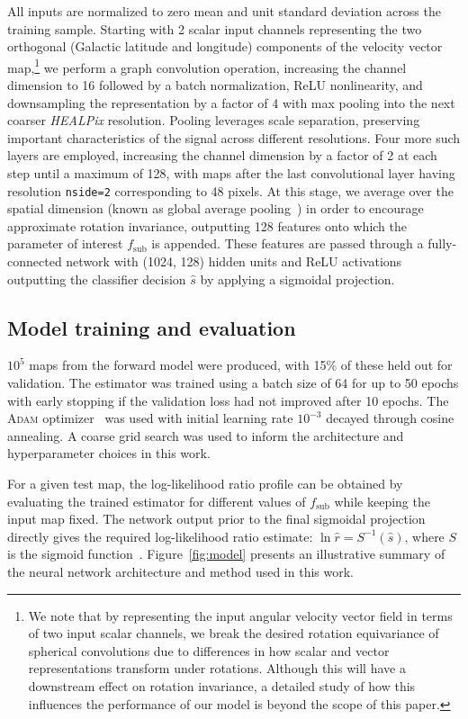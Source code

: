 \documentclass[twocolumn,linenumbers]{aastex631}
\newcommand{\package}[1]{\textsl{#1}\xspace}
\newcommand{\healpix}{\package{HEALPix}}
\begin{document}
All inputs are normalized to zero mean and unit standard deviation across the training sample. Starting with 2 scalar input channels representing the two orthogonal (Galactic latitude and longitude) components of the velocity vector map,\footnote{We note that by representing the input angular velocity vector field in terms of two input scalar channels, we break the desired rotation equivariance of spherical convolutions due to differences in how scalar and vector representations transform under rotations. Although this will have a downstream effect on rotation invariance, a detailed study of how this influences the performance of our model is beyond the scope of this paper.} we perform a graph convolution operation, increasing the channel dimension to 16 followed by a batch normalization, ReLU nonlinearity, and downsampling the representation by a factor of 4 with max pooling into the next coarser \healpix resolution. Pooling leverages scale separation, preserving important characteristics of the signal across different resolutions. 
Four more such layers are employed, increasing the channel dimension by a factor of 2 at each step until a maximum of 128, with maps after the last convolutional layer having resolution \texttt{nside=2} corresponding to 48 pixels. At this stage, we average over the spatial dimension (known as global average pooling~\citep{lin2014network}) in order to encourage approximate rotation invariance, outputting 128 features onto which the parameter of interest $f_\mathrm{sub}$ is appended. These features are passed through a fully-connected network with (1024, 128) hidden units and ReLU activations outputting the classifier decision $\hat s$ by applying a sigmoidal projection.

\subsection{Model training and evaluation} 

$10^5$ maps from the forward model were produced, with 15\% of these held out for validation. The estimator was trained using a batch size of 64 for up to 50 epochs with early stopping if the validation loss had not improved after 10 epochs. The \textsc{Adam} optimizer~\citep{kingma2017adam} was used with initial learning rate $10^{-3}$ decayed through cosine annealing. A coarse grid search was used to inform the architecture and hyperparameter choices in this work. 

For a given test map, the log-likelihood ratio profile can be obtained by evaluating the trained estimator for different values of $f_\mathrm{sub}$ while keeping the input map fixed. The network output prior to the final sigmoidal projection directly gives the required log-likelihood ratio estimate: $\ln\hat r = S^{-1}(\hat s)$, where $S$ is the sigmoid function~\citep{Hermans:2019ioj,Hermans:2020skz}.
Figure~\ref{fig:model} presents an illustrative summary of the neural network architecture and method used in this work. \vspace{0.5cm}
\end{document}
